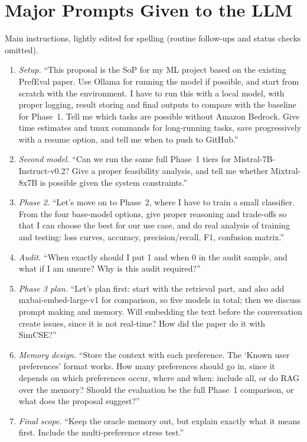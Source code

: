 \documentclass[lettersize,journal]{IEEEtran}
\begin{document}
\section{Major Prompts Given to the LLM}
Main instructions, lightly edited for spelling (routine follow-ups and status checks omitted).
\begin{enumerate}
  \item \emph{Setup.} ``This proposal is the SoP for my ML project based on the existing PrefEval paper. Use Ollama for running the model if
        possible, and start from scratch with the environment. I have to run this with a local model, with proper logging, result storing and
        final outputs to compare with the baseline for Phase~1. Tell me which tasks are possible without Amazon Bedrock. Give time estimates
        and tmux commands for long-running tasks, save progressively with a resume option, and tell me when to push to GitHub.''
  \item \emph{Second model.} ``Can we run the same full Phase~1 tiers for Mistral-7B-Instruct-v0.2? Give a proper feasibility analysis, and tell me
        whether Mixtral-8x7B is possible given the system constraints.''
  \item \emph{Phase 2.} ``Let's move on to Phase~2, where I have to train a small classifier. From the four base-model options, give proper
        reasoning and trade-offs so that I can choose the best for our use case, and do real analysis of training and testing: loss curves,
        accuracy, precision/recall, F1, confusion matrix.''
  \item \emph{Audit.} ``When exactly should I put 1 and when 0 in the audit sample, and what if I am unsure? Why is this audit required?''
  \item \emph{Phase 3 plan.} ``Let's plan first: start with the retrieval part, and also add mxbai-embed-large-v1 for comparison, so five
        models in total; then we discuss prompt making and memory. Will embedding the text before the conversation create issues, since it is
        not real-time? How did the paper do it with SimCSE?''
  \item \emph{Memory design.} ``Store the context with each preference. The `Known user preferences' format works. How many preferences should go
        in, since it depends on which preferences occur, where and when: include all, or do RAG over the memory? Should the evaluation be the full
        Phase~1 comparison, or what does the proposal suggest?''
  \item \emph{Final scope.} ``Keep the oracle memory out, but explain exactly what it means first. Include the multi-preference stress test.''
\end{enumerate}
\end{document}
